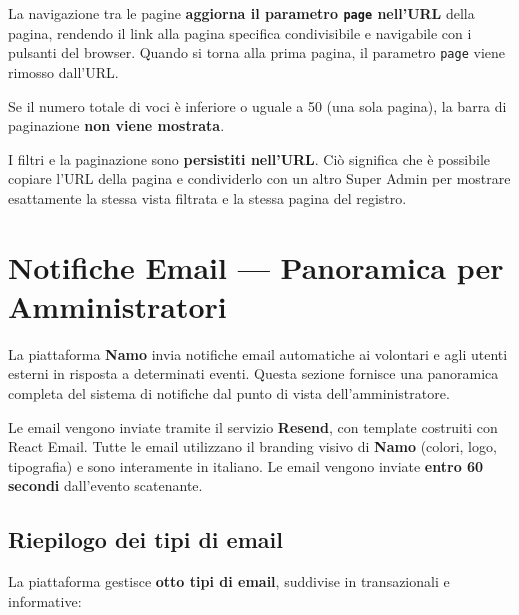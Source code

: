 \documentclass[a4paper,11pt,oneside]{book}
\newcommand{\namo}{\textbf{Namo}}
\begin{document}
La navigazione tra le pagine \textbf{aggiorna il parametro \texttt{page} nell'URL} della pagina, rendendo il link alla pagina specifica condivisibile e navigabile con i pulsanti del browser. Quando si torna alla prima pagina, il parametro \texttt{page} viene rimosso dall'URL.

Se il numero totale di voci \`e inferiore o uguale a 50 (una sola pagina), la barra di paginazione \textbf{non viene mostrata}.

\begin{tipbox}
I filtri e la paginazione sono \textbf{persistiti nell'URL}. Ci\`o significa che \`e possibile copiare l'URL della pagina e condividerlo con un altro Super Admin per mostrare esattamente la stessa vista filtrata e la stessa pagina del registro.
\end{tipbox}

\section{Notifiche Email --- Panoramica per Amministratori}
\label{sec:notifiche-panoramica}

La piattaforma \namo{} invia notifiche email automatiche ai volontari e agli utenti esterni in risposta a determinati eventi. Questa sezione fornisce una panoramica completa del sistema di notifiche dal punto di vista dell'amministratore.

\begin{infobox}
Le email vengono inviate tramite il servizio \textbf{Resend}, con template costruiti con React Email. Tutte le email utilizzano il branding visivo di \namo{} (colori, logo, tipografia) e sono interamente in italiano. Le email vengono inviate \textbf{entro 60 secondi} dall'evento scatenante.
\end{infobox}

\subsection{Riepilogo dei tipi di email}

La piattaforma gestisce \textbf{otto tipi di email}, suddivise in transazionali e informative:
\end{document}
